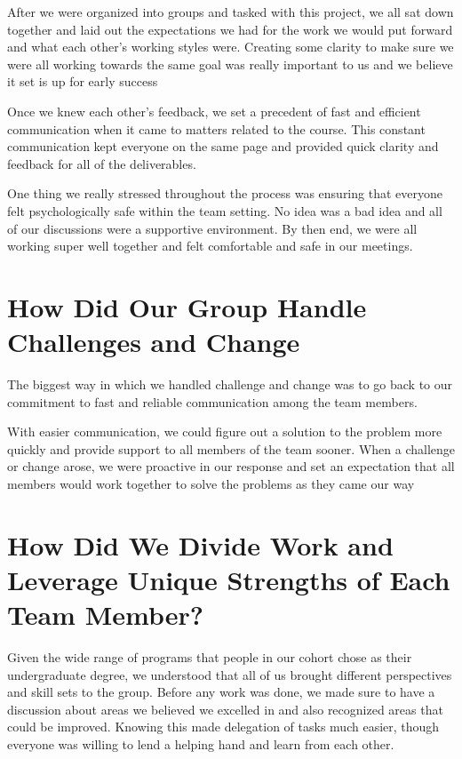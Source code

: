 \documentclass[
]{book}
\begin{document}
After we were organized into groups and tasked with this project, we all sat down together and laid out the expectations we had for the work we would put forward and what each other's working styles were. Creating some clarity to make sure we were all working towards the same goal was really important to us and we believe it set is up for early success

Once we knew each other's feedback, we set a precedent of fast and efficient communication when it came to matters related to the course. This constant communication kept everyone on the same page and provided quick clarity and feedback for all of the deliverables.

One thing we really stressed throughout the process was ensuring that everyone felt psychologically safe within the team setting. No idea was a bad idea and all of our discussions were a supportive environment. By then end, we were all working super well together and felt comfortable and safe in our meetings.

\hypertarget{how-did-our-group-handle-challenges-and-change}{%
\section{How Did Our Group Handle Challenges and Change}\label{how-did-our-group-handle-challenges-and-change}}

The biggest way in which we handled challenge and change was to go back to our commitment to fast and reliable communication among the team members.

With easier communication, we could figure out a solution to the problem more quickly and provide support to all members of the team sooner. When a challenge or change arose, we were proactive in our response and set an expectation that all members would work together to solve the problems as they came our way

\hypertarget{how-did-we-divide-work-and-leverage-unique-strengths-of-each-team-member}{%
\section{How Did We Divide Work and Leverage Unique Strengths of Each Team Member?}\label{how-did-we-divide-work-and-leverage-unique-strengths-of-each-team-member}}

Given the wide range of programs that people in our cohort chose as their undergraduate degree, we understood that all of us brought different perspectives and skill sets to the group. Before any work was done, we made sure to have a discussion about areas we believed we excelled in and also recognized areas that could be improved. Knowing this made delegation of tasks much easier, though everyone was willing to lend a helping hand and learn from each other.
\end{document}
